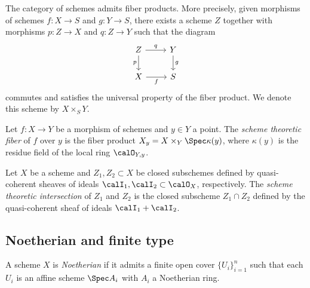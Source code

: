     \begin{theorem}\label{thm:fiber_product_of_schemes_exists}
        The category of schemes admits fiber products.
        More precisely, given morphisms of schemes \(f : X \to S\) and \(g : Y \to S\), there exists a scheme \(Z\) together with morphisms \(p : Z \to X\) and \(q : Z \to Y\) such that the diagram
        \[
            \begin{tikzcd}
                Z \arrow[r, "q"] \arrow[d, "p"'] & Y \arrow[d, "g"] \\
                X \arrow[r, "f"'] & S
            \end{tikzcd}
        \]
        commutes and satisfies the universal property of the fiber product.
        We denote this scheme by \(X \times_S Y\).
    \end{theorem}

    \begin{definition}\label{def:scheme_theoretic_fiber}
        Let \(f : X \to Y\) be a morphism of schemes and \(y \in Y\) a point.
        The \emph{scheme theoretic fiber} of \(f\) over \(y\) is the fiber product \(X_y = X \times_Y \Spec \kappa(y)\), where \(\kappa(y)\) is the residue field of the local ring \(\calO_{Y,y}\).
        
    \end{definition}

    \begin{definition}\label{def:scheme_theoretic_intersection}
        Let \(X\) be a scheme and \(Z_1, Z_2 \subset X\) be closed subschemes defined by quasi-coherent sheaves of ideals \(\calI_1, \calI_2 \subset \calO_X\), respectively.
        The \emph{scheme theoretic intersection} of \(Z_1\) and \(Z_2\) is the closed subscheme \(Z_1 \cap Z_2\) defined by the quasi-coherent sheaf of ideals \(\calI_1 + \calI_2\).
    \end{definition}


\subsection{Noetherian and finite type}

    \begin{definition}\label{def:noetherian_scheme}
        A scheme \(X\) is \emph{Noetherian} if it admits a finite open cover \(\{U_i\}_{i=1}^n\) such that each \(U_i\) is an affine scheme \(\Spec A_i\) with \(A_i\) a Noetherian ring.
    \end{definition}

